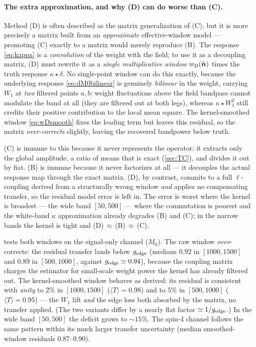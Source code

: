 \documentclass[11pt]{article}
\newcommand{\nv}{\hat{\boldsymbol{n}}}
\newcommand{\Wone}{W_1}
\newcommand{\dt}{\delta}
\begin{document}
\paragraph{The extra approximation, and why (D) can do worse than (C).}
Method (D) is often described as the matrix generalization of (C), but it is more
precisely a matrix built from an \emph{approximate} effective-window model ---
promoting (C) exactly to a matrix would merely reproduce (B). The response
\cref{eq:kappa} is a \emph{convolution} of the weight with the field; to use it
as a decoupling matrix, (D) must rewrite it as a \emph{single multiplicative
window} $w_{\rm D}(\nv)$ times the truth response $\kappa\star\dt$. No
single-point window can do this exactly, because the underlying response
\cref{eq:dM0bilinear} is genuinely \emph{bilinear} in the weight, carrying
$\Wone$ at \emph{two} filtered points $a,b$: weight fluctuations above the field
bandpass cannot modulate the band at all (they are filtered out at both legs),
whereas $\kappa\star\Wone^2$ still credits their positive contribution to the
local mean square. The kernel-smoothed window \cref{eq:wDsmooth} fixes the
leading term but leaves this residual, so the matrix \emph{over-corrects}
slightly, leaving the recovered bandpower below truth.

(C) is immune to this because it never represents the operator: it extracts only
the global amplitude, a ratio of means that is exact (\cref{sec:TC}), and divides
it out by fiat. (B) is immune because it never factorizes at all --- it decouples
the actual response map through the exact matrix. (D), by contrast, commits to a
full $\ell$-coupling derived from a structurally wrong window \emph{and} applies
no compensating transfer, so the residual model error is left in. The error is
worst where the kernel is broadest --- the wide band $[50,500]$ --- where the
commutation is poorest and the white-band $\kappa$ approximation already degrades
(B) and (C); in the narrow bands the kernel is tight and (D)$\,\approx\,$(B)$\,
\approx\,$(C).

 tests both windows on the signal-only channel ($M_0$). The
raw window \emph{over}-corrects: the residual transfer lands below $g_{\rm edge}$
(medians $0.92$ in $[1000,1500]$ and $0.89$ in $[500,1000]$, against
$g_{\rm edge}\simeq0.94$), because the coupling matrix charges the estimator for
small-scale weight power the kernel has already filtered out. The kernel-smoothed
window behaves as derived: its residual is consistent with \emph{unity} to $2\%$
in $[1000,1500]$ ($\langle T\rangle=0.98$) and to $5\%$ in $[500,1000]$
($\langle T\rangle=0.95$) --- the $\Wone$ lift \emph{and} the edge loss both
absorbed by the matrix, no transfer applied. (The two variants differ by a nearly
flat factor $\simeq1/g_{\rm edge}$.) In the wide band $[50,500]$ the deficit
grows to $\sim15\%$. The spin-4 channel follows the same pattern within its much
larger transfer uncertainty (median smoothed-window residuals $0.87$--$0.90$).
\end{document}
